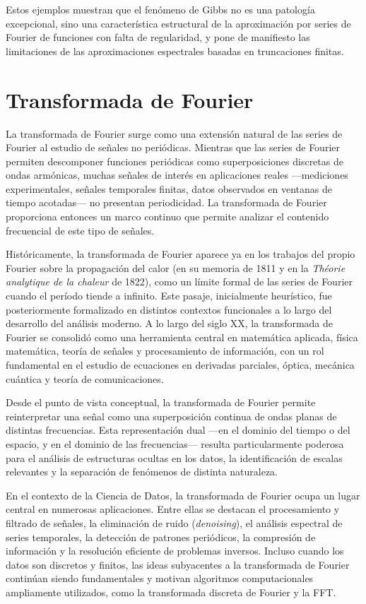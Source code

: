 \documentclass[12pt, a4paper]{amsbook}
\theoremstyle{remark}
\theoremstyle{definition}
\numberwithin{section}{chapter}
\numberwithin{subsection}{section}
\numberwithin{equation}{section}
\numberwithin{figure}{chapter}
\begin{document}
Estos ejemplos muestran que el fenómeno de Gibbs no es una patología excepcional, sino una característica estructural de la aproximación por series de Fourier de funciones con falta de regularidad, y pone de manifiesto las limitaciones de las aproximaciones espectrales basadas en truncaciones finitas.



\chapter{Transformada de Fourier}\label{chap:transformada}

La transformada de Fourier surge como una extensión natural de las series de Fourier al estudio de señales no periódicas. Mientras que las series de Fourier permiten descomponer funciones periódicas como superposiciones discretas de ondas armónicas, muchas señales de interés en aplicaciones reales —mediciones experimentales, señales temporales finitas, datos observados en ventanas de tiempo acotadas— no presentan periodicidad. La transformada de Fourier proporciona entonces un marco continuo que permite analizar el contenido frecuencial de este tipo de señales.

Históricamente, la transformada de Fourier aparece ya en los trabajos del propio Fourier sobre la propagación del calor (en su memoria de 1811 y en la \emph{Théorie analytique de la chaleur} de 1822), como un límite formal de las series de Fourier cuando el período tiende a infinito. Este pasaje, inicialmente heurístico, fue posteriormente formalizado en distintos contextos funcionales a lo largo del desarrollo del análisis moderno. A lo largo del siglo XX, la transformada de Fourier se consolidó como una herramienta central en matemática aplicada, física matemática, teoría de señales y procesamiento de información, con un rol fundamental en el estudio de ecuaciones en derivadas parciales, óptica, mecánica cuántica y teoría de comunicaciones.

Desde el punto de vista conceptual, la transformada de Fourier permite reinterpretar una señal como una superposición continua de ondas planas de distintas frecuencias. Esta representación dual —en el dominio del tiempo o del espacio, y en el dominio de las frecuencias— resulta particularmente poderosa para el análisis de estructuras ocultas en los datos, la identificación de escalas relevantes y la separación de fenómenos de distinta naturaleza.

En el contexto de la Ciencia de Datos, la transformada de Fourier ocupa un lugar central en numerosas aplicaciones. Entre ellas se destacan el procesamiento y filtrado de señales, la eliminación de ruido (\emph{denoising}), el análisis espectral de series temporales, la detección de patrones periódicos, la compresión de información y la resolución eficiente de problemas inversos. Incluso cuando los datos son discretos y finitos, las ideas subyacentes a la transformada de Fourier continúan siendo fundamentales y motivan algoritmos computacionales ampliamente utilizados, como la transformada discreta de Fourier y la FFT.
\end{document}
